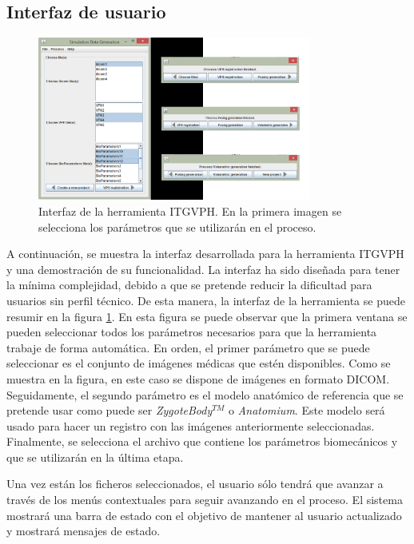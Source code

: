 \subsection{Interfaz de usuario}
\label{rasim:herramientaui}

\begin{figure}[h]
    \centering
    \includegraphics[width=0.8\textwidth]{IMG/toolkitui.png}
    \caption{Interfaz de la herramienta \ac{ITGVPH}. En la primera imagen se selecciona los parámetros que se utilizarán en el proceso. }
    \label{fig:toolui}
\end{figure}


A continuación, se muestra la interfaz desarrollada para la herramienta \ac{ITGVPH} y una demostración de su funcionalidad. 
La interfaz ha sido diseñada para tener la mínima complejidad, debido a que se pretende reducir la dificultad para usuarios sin perfil técnico. De esta manera, la interfaz de la herramienta se puede resumir en la figura \ref{fig:toolui}. En esta figura se puede observar que la primera ventana se pueden seleccionar todos los parámetros necesarios para que la herramienta trabaje de forma automática.
En orden, el primer parámetro que se puede seleccionar es el conjunto de imágenes médicas que estén disponibles. Como se muestra en la figura, en este caso se dispone de imágenes en formato \ac{DICOM}.
Seguidamente, el segundo parámetro es el modelo anatómico de referencia que se pretende usar como puede ser \emph{ZygoteBody}$^{TM}$ o \emph{Anatomium}. Este modelo será usado para hacer un registro con las imágenes anteriormente seleccionadas. 
Finalmente, se selecciona el archivo que contiene los parámetros biomecánicos y que se utilizarán en la última etapa.



Una vez están los ficheros seleccionados, el usuario sólo tendrá que avanzar a través de los menús contextuales para seguir avanzando en el proceso. El sistema mostrará una barra de estado con el objetivo de mantener al usuario actualizado y mostrará mensajes de estado.



